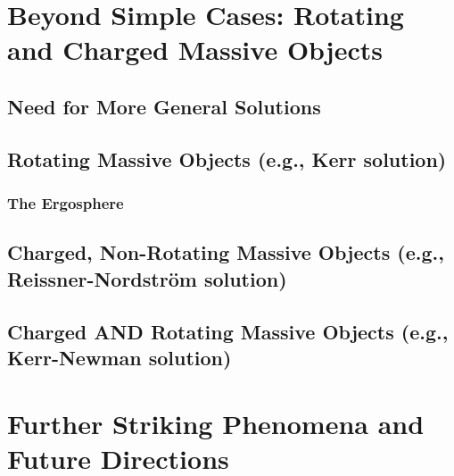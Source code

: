 \documentclass{amsart}
\theoremstyle{definition}
\theoremstyle{remark}
\begin{document}
\section{Beyond Simple Cases: Rotating and Charged Massive Objects}
\label{sec:kerr_etc}

\subsection{Need for More General Solutions}

\subsection{Rotating Massive Objects (e.g., Kerr solution)}
\subsubsection{The Ergosphere}

\subsection{Charged, Non-Rotating Massive Objects (e.g., Reissner-Nordström solution)}

\subsection{Charged AND Rotating Massive Objects (e.g., Kerr-Newman solution)}

\section{Further Striking Phenomena and Future Directions}
\label{sec:future_phenomena}
\end{document}
